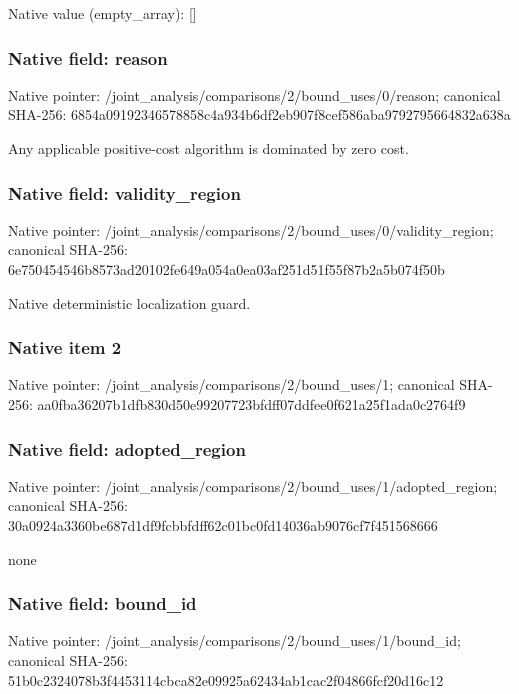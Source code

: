 \documentclass[10pt,a4paper]{article}
\begin{document}
Native value (empty\_\allowbreak{}array): []

\subsubsection{Native field: reason}
Native pointer: /joint\_\allowbreak{}analysis/comparisons/2/bound\_\allowbreak{}uses/0/reason; canonical SHA-256: 6854a09192346578858c4a934b6df2eb907f8cef586aba9792795664832a638a

\begingroup\raggedright\sloppy Any applicable positive-cost algorithm is dominated by zero cost.\par\endgroup

\subsubsection{Native field: validity\_\allowbreak{}region}
Native pointer: /joint\_\allowbreak{}analysis/comparisons/2/bound\_\allowbreak{}uses/0/validity\_\allowbreak{}region; canonical SHA-256: 6e750454546b8573ad20102fe649a054a0ea03af251d51f55f87b2a5b074f50b

\begingroup\raggedright\sloppy Native deterministic localization guard.\par\endgroup

\subsubsection{Native item 2}
Native pointer: /joint\_\allowbreak{}analysis/comparisons/2/bound\_\allowbreak{}uses/1; canonical SHA-256: aa0fba36207b1dfb830d50e99207723bfdff07ddfee0f621a25f1ada0c2764f9

\subsubsection{Native field: adopted\_\allowbreak{}region}
Native pointer: /joint\_\allowbreak{}analysis/comparisons/2/bound\_\allowbreak{}uses/1/adopted\_\allowbreak{}region; canonical SHA-256: 30a0924a3360be687d1df9fcbbfdff62c01bc0fd14036ab9076cf7f451568666

\begingroup\raggedright\sloppy none\par\endgroup

\subsubsection{Native field: bound\_\allowbreak{}id}
Native pointer: /joint\_\allowbreak{}analysis/comparisons/2/bound\_\allowbreak{}uses/1/bound\_\allowbreak{}id; canonical SHA-256: 51b0c2324078b3f4453114cbca82e09925a62434ab1cac2f04866fcf20d16c12
\end{document}
